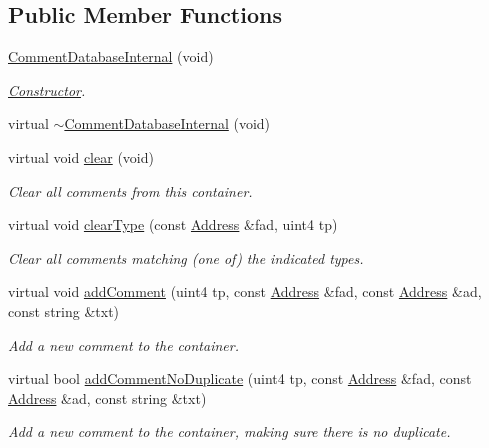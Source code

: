 \subsection*{Public Member Functions}
\begin{DoxyCompactItemize}
\item 
\mbox{\hyperlink{class_comment_database_internal_a3a466e50a8124004effddd14e4e71eb4}{Comment\+Database\+Internal}} (void)
\begin{DoxyCompactList}\small\item\em \mbox{\hyperlink{class_constructor}{Constructor}}. \end{DoxyCompactList}\item 
virtual \mbox{\hyperlink{class_comment_database_internal_a03fa48fbd6fdea999bfa5f1a508c9b25}{$\sim$\+Comment\+Database\+Internal}} (void)
\item 
virtual void \mbox{\hyperlink{class_comment_database_internal_a19c22a8d1e9ea5ea38c321e778e7c063}{clear}} (void)
\begin{DoxyCompactList}\small\item\em Clear all comments from this container. \end{DoxyCompactList}\item 
virtual void \mbox{\hyperlink{class_comment_database_internal_a5ab44b5d53ca52aef756c9ad476e2b34}{clear\+Type}} (const \mbox{\hyperlink{class_address}{Address}} \&fad, uint4 tp)
\begin{DoxyCompactList}\small\item\em Clear all comments matching (one of) the indicated types. \end{DoxyCompactList}\item 
virtual void \mbox{\hyperlink{class_comment_database_internal_af6169fd8d7de0aa0d41a80c38a179d6d}{add\+Comment}} (uint4 tp, const \mbox{\hyperlink{class_address}{Address}} \&fad, const \mbox{\hyperlink{class_address}{Address}} \&ad, const string \&txt)
\begin{DoxyCompactList}\small\item\em Add a new comment to the container. \end{DoxyCompactList}\item 
virtual bool \mbox{\hyperlink{class_comment_database_internal_af3ba80fc4fd50954903bf2d0c54f36a8}{add\+Comment\+No\+Duplicate}} (uint4 tp, const \mbox{\hyperlink{class_address}{Address}} \&fad, const \mbox{\hyperlink{class_address}{Address}} \&ad, const string \&txt)
\begin{DoxyCompactList}\small\item\em Add a new comment to the container, making sure there is no duplicate. \end{DoxyCompactList}\item 

\end{DoxyCompactItemize}
